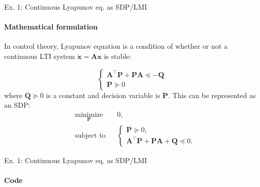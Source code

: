 \documentclass{beamer}
\begin{document}
\begin{frame}{Ex. 1: Continuous Lyapunov eq. as SDP/LMI}
\framesubtitle{Mathematical formulation}
\begin{flushleft}

In control theory, Lyapunov equation is a condition of whether or not a continuous LTI system $\dot{\mathbf{x}} = \mathbf{A}\mathbf{x}$ is stable:

\begin{equation}
    \begin{cases}
        \mathbf{A}^\top\mathbf{P} + \mathbf{P}\mathbf{A}  \preceq -\mathbf{Q} \\
        \mathbf{P} \succeq 0
    \end{cases}
\end{equation}
%
where $\mathbf{Q} \succeq 0$ is a constant and decision variable is $\mathbf{P}$. This can be represented as an SDP:
%
\begin{equation}
\begin{aligned}
& \underset{\mathbf{P}}{\text{minimize}}
& & 0, \\
& \text{subject to}
& & \begin{cases}
    \mathbf{P} \succeq 0, \\
    \mathbf{A}^\top\mathbf{P} + \mathbf{P}\mathbf{A} + \mathbf{Q} \preceq 0.
    \end{cases}
\end{aligned}
\end{equation}


\end{flushleft}
\end{frame}




\begin{frame}{Ex. 1: Continuous Lyapunov eq. as SDP/LMI}
\framesubtitle{Code}
\begin{flushleft}



\end{flushleft}
\end{frame}
\end{document}
